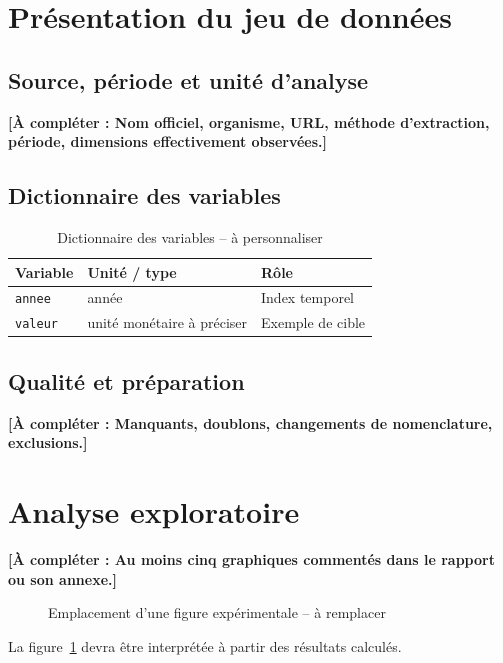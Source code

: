 \documentclass[11pt,a4paper]{article}
\newcommand{\achanger}[1]{\textcolor{blue!60!black}{\textbf{[À compléter : #1]}}}
\begin{document}
\section{Présentation du jeu de données}\label{sec:data}
\subsection{Source, période et unité d'analyse}
\achanger{Nom officiel, organisme, URL, méthode d'extraction, période, dimensions effectivement observées.}
\subsection{Dictionnaire des variables}
\begin{table}[ht]\centering
\caption{Dictionnaire des variables -- à personnaliser}\label{tab:variables}
\begin{tabular}{lll}\toprule Variable & Unité / type & Rôle\\\midrule
\texttt{annee} & année & Index temporel\\
\texttt{valeur} & unité monétaire à préciser & Exemple de cible\\
\bottomrule\end{tabular}
\end{table}
\subsection{Qualité et préparation}\achanger{Manquants, doublons, changements de nomenclature, exclusions.}
\section{Analyse exploratoire}\label{sec:eda}
\achanger{Au moins cinq graphiques commentés dans le rapport ou son annexe.}
\begin{figure}[ht]\centering
\caption{Emplacement d'une figure expérimentale -- à remplacer}\label{fig:exemple}
\end{figure}
La figure~\ref{fig:exemple} devra être interprétée à partir des résultats calculés.
\end{document}
